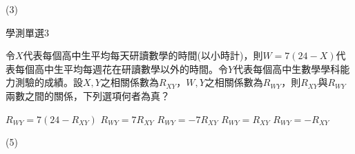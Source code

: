 \begin{QUESTIONS}
\begin{QUESTION}
\begin{QFROMS}
        \end{QFROMS}
        \begin{QTAGS}\end{QTAGS}
        \begin{QANS}
            (3)
        \end{QANS}
        \begin{QSOLLIST}
            \begin{QSOL}
            \end{QSOL}
        \end{QSOLLIST}
        \begin{QEMPTYSPACE}
        \end{QEMPTYSPACE}
    \end{QUESTION}
    \begin{QUESTION}
        \begin{ExamInfo}{90}{學測}{單選}{3}
        \end{ExamInfo}
        \begin{ExamAnsRateInfo}{}{}{}{}
        \end{ExamAnsRateInfo}
        \begin{QBODY}
				令$X$代表每個高中生平均每天研讀數學的時間(以小時計)，則$W=7(24-X)$代表每個高中生平均每週花在研讀數學以外的時間。令$Y$代表每個高中生數學學科能力測驗的成績。設$X,Y$之相關係數為$R_{XY}$，$W,Y$之相關係數為$R_{WY}$，則$R_{XY}$與$R_{WY}$ 兩數之間的關係，下列選項何者為真？
				\begin{QOPS}
					\QOP ${{R}_{WY}}=7\left( 24-{{R}_{XY}} \right)$
					\QOP ${{R}_{WY}}=7{{R}_{XY}}$
					\QOP ${{R}_{WY}}=-7{{R}_{XY}}$
					\QOP ${{R}_{WY}}={{R}_{XY}}$
					\QOP ${{R}_{WY}}=-{{R}_{XY}}$
				\end{QOPS}
        \end{QBODY}
        \begin{QFROMS}
        \end{QFROMS}
        \begin{QTAGS}\end{QTAGS}
        \begin{QANS}
            (5)
        \end{QANS}
        \begin{QSOLLIST}
        \end{QSOLLIST}
        \begin{QEMPTYSPACE}
        \end{QEMPTYSPACE}
    \end{QUESTION}
\end{QUESTIONS}
